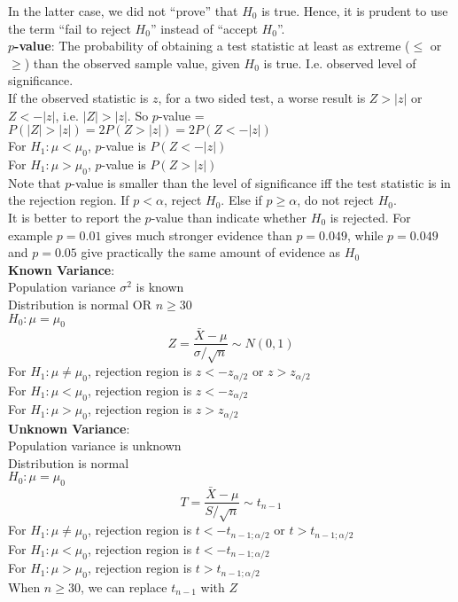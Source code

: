 \documentclass{article}
\begin{document}
\begin{multicols*}{3}
In the latter case, we did not ``prove'' that $H_0$ is true. Hence, it is prudent to use the term ``fail to reject $H_0$'' instead of ``accept $H_0$''.\\
\textbf{$p$-value}: The probability of obtaining a test statistic at least as extreme ($\leq$ or $\geq$) than the observed sample value, given $H_0$ is true. I.e. observed level of significance. \\
If the observed statistic is $z$, for a two sided test, a worse result is $Z>|z|$ or $Z<-|z|$, i.e. $|Z|>|z|$. So $p$-value = $P(|Z|>|z|)=2P(Z>|z|)=2P(Z<-|z|)$\\
For $H_1:\mu<\mu_0$, $p$-value is $P(Z<-|z|)$\\
For $H_1:\mu>\mu_0$, $p$-value is $P(Z>|z|)$\\
Note that $p$-value is smaller than the level of significance iff the test statistic is in the rejection region. If $p<\alpha$, reject $H_0$. Else if $p\geq\alpha$, do not reject $H_0$.\\ 
It is better to report the $p$-value than indicate whether $H_0$ is rejected. For example $p=0.01$ gives much stronger evidence than $p=0.049$, while $p=0.049$ and $p=0.05$ give practically the same amount of evidence as $H_0$\\
\textbf{Known Variance}:\\
Population variance $\sigma^2$ is known\\
Distribution is normal OR $n\geq 30$\\
$H_0:\mu=\mu_0$
$$Z=\frac{\bar{X}-\mu}{\sigma/\sqrt{n}}\sim N(0,1)$$
For $H_1:\mu\not=\mu_0$, rejection region is $z<-z_{\alpha/2}$ or $z>z_{\alpha/2}$\\
For $H_1:\mu<\mu_0$, rejection region is $z<-z_{\alpha/2}$ \\
For $H_1:\mu>\mu_0$, rejection region is $z>z_{\alpha/2}$\\
\textbf{Unknown Variance}: \\
Population variance is unknown\\
Distribution is normal\\
$H_0:\mu=\mu_0$
$$T=\frac{\bar{X}-\mu}{S/\sqrt{n}}\sim t_{n-1}$$
For $H_1:\mu\not=\mu_0$, rejection region is $t<-t_{n-1;\alpha/2}$ or $t>t_{n-1;\alpha/2}$\\
For $H_1:\mu<\mu_0$, rejection region is $t<-t_{n-1;\alpha/2}$ \\
For $H_1:\mu>\mu_0$, rejection region is $t>t_{n-1;\alpha/2}$\\
When $n\geq 30$, we can replace $t_{n-1}$ with $Z$\\

\end{multicols*}
\end{document}
